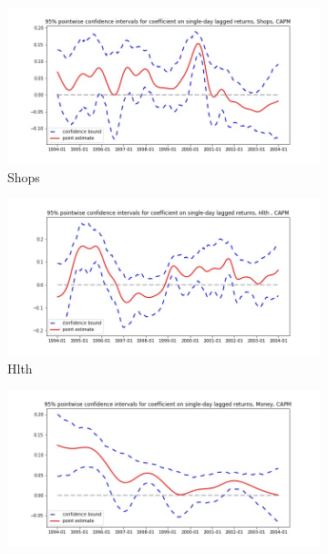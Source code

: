 \documentclass{article}
\begin{document}
\begin{figure}
  
  \begin{subfigure}[b]{0.5\textwidth}
    \centering
    \includegraphics[width=\textwidth]{Shops/pointwiseCIs_CAPM.jpg}
    \caption{Shops}
    \label{fig:2}
  \end{subfigure}
  \begin{subfigure}[b]{0.5\textwidth}
    \centering
    \includegraphics[width=\textwidth]{Hlth/pointwiseCIs_CAPM.jpg}
    \caption{Hlth}
    \label{fig:2}
  \end{subfigure}
  \begin{subfigure}[b]{0.5\textwidth}
    \centering
    \includegraphics[width=\textwidth]{Money/pointwiseCIs_CAPM.jpg}

\end{subfigure}
\end{figure}
\end{document}
